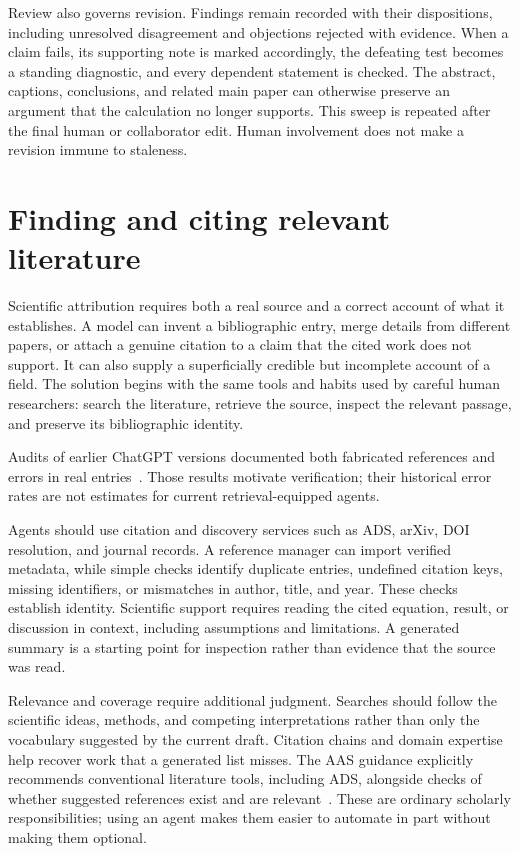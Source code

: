 \documentclass[aps,prd,reprint,nofootinbib]{revtex4-2}
\begin{document}
Review also governs revision. Findings remain recorded with their dispositions, including unresolved disagreement and objections rejected with evidence. When a claim fails, its supporting note is marked accordingly, the defeating test becomes a standing diagnostic, and every dependent statement is checked. The abstract, captions, conclusions, and related main paper can otherwise preserve an argument that the calculation no longer supports. This sweep is repeated after the final human or collaborator edit. Human involvement does not make a revision immune to staleness.

\section{Finding and citing relevant literature}\label{sec:literature}
Scientific attribution requires both a real source and a correct account of what it establishes. A model can invent a bibliographic entry, merge details from different papers, or attach a genuine citation to a claim that the cited work does not support. It can also supply a superficially credible but incomplete account of a field. The solution begins with the same tools and habits used by careful human researchers: search the literature, retrieve the source, inspect the relevant passage, and preserve its bibliographic identity.

Audits of earlier ChatGPT versions documented both fabricated references and errors in real entries~\cite{Walters2023}. Those results motivate verification; their historical error rates are not estimates for current retrieval-equipped agents.

Agents should use citation and discovery services such as ADS, arXiv, DOI resolution, and journal records. A reference manager can import verified metadata, while simple checks identify duplicate entries, undefined citation keys, missing identifiers, or mismatches in author, title, and year. These checks establish identity. Scientific support requires reading the cited equation, result, or discussion in context, including assumptions and limitations. A generated summary is a starting point for inspection rather than evidence that the source was read.

Relevance and coverage require additional judgment. Searches should follow the scientific ideas, methods, and competing interpretations rather than only the vocabulary suggested by the current draft. Citation chains and domain expertise help recover work that a generated list misses. The AAS guidance explicitly recommends conventional literature tools, including ADS, alongside checks of whether suggested references exist and are relevant~\cite{AAS2026}. These are ordinary scholarly responsibilities; using an agent makes them easier to automate in part without making them optional.
\end{document}
